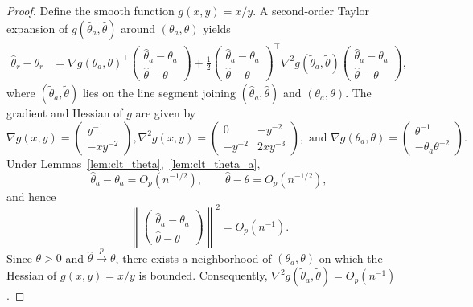 \documentclass[12pt]{article}
\theoremstyle{plain}
\theoremstyle{definition}
\begin{document}
\begin{proof}
Define the smooth function \( g(x,y) = x/y \). A second-order Taylor expansion of
\( g(\hat{\theta}_a, \hat{\theta}) \) around \( (\theta_a, \theta) \) yields
\begin{align}
\hat{\theta}_r - \theta_r
&=
\nabla g(\theta_a,\theta)^\top
\begin{pmatrix}
\hat{\theta}_a - \theta_a \\
\hat{\theta} - \theta
\end{pmatrix}
+
\frac{1}{2}
\begin{pmatrix}
\hat{\theta}_a - \theta_a \\
\hat{\theta} - \theta
\end{pmatrix}^\top
\nabla^2 g(\tilde{\theta}_a,\tilde{\theta})
\begin{pmatrix}
\hat{\theta}_a - \theta_a \\
\hat{\theta} - \theta
\end{pmatrix},
\label{eq:taylor_expansion}
\end{align}
where \( (\tilde{\theta}_a,\tilde{\theta}) \) lies on the line segment joining
\( (\hat{\theta}_a,\hat{\theta}) \) and \( (\theta_a,\theta) \).
The gradient and Hessian of \( g \) are given by
\[
\nabla g(x,y)
=
\begin{pmatrix}
y^{-1} \\
-xy^{-2}
\end{pmatrix},
\nabla^2 g(x,y)
=
\begin{pmatrix}
0 & -y^{-2} \\
-y^{-2} & 2xy^{-3}
\end{pmatrix},\text{ and }
\nabla g(\theta_a,\theta)
=
\begin{pmatrix}
\theta^{-1} \\
-\theta_a \theta^{-2}
\end{pmatrix}.
\]
Under Lemmas~\ref{lem:clt_theta},~\ref{lem:clt_theta_a},
\[
\hat{\theta}_a - \theta_a = O_p(n^{-1/2}),
\qquad
\hat{\theta} - \theta = O_p(n^{-1/2}),
\]
and hence
\[
\left\|
\begin{pmatrix}
\hat{\theta}_a - \theta_a \\
\hat{\theta} - \theta
\end{pmatrix}
\right\|^2
= O_p(n^{-1}).
\]
Since $\theta>0$ and $\hat{\theta}\xrightarrow{p}\theta$, there exists a neighborhood of $(\theta_a,\theta)$ on which the Hessian of $g(x,y)=x/y$ is bounded. Consequently, $\nabla^2 g(\tilde{\theta}_a,\tilde{\theta})=O_p(n^{-1})$.


\end{proof}
\end{document}
